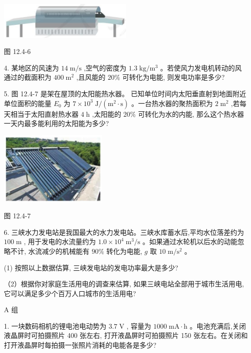 \documentclass[10pt]{article}
\begin{document}
\begin{center}
\includegraphics[max width=0.5\textwidth]{images/01911d5f-8e38-70c0-b5b8-2b399bd115b6_104_375437.jpg}
\end{center}

图 12.4-6

4. 某地区的风速为 \({14}\mathrm{\;m}/\mathrm{s}\) ,空气的密度为 \({1.3}\mathrm{\;{kg}}/{\mathrm{m}}^{3}\) 。若使风力发电机转动的风通过的截面积为 \({400}{\mathrm{\;m}}^{2}\) ,且风能的 \({20}\%\) 可转化为电能, 则发电功率是多少?

5. 图 12.4-7 是架在屋顶的太阳能热水器。 已知单位时间内太阳垂直射到地面附近单位面积的能量 \({E}_{0}\) 为 \(7 \times {10}^{3}\mathrm{\;J}/\left( {{\mathrm{m}}^{2} \cdot \mathrm{s}}\right)\) 。一台热水器的聚热面积为 \(2{\mathrm{\;m}}^{2}\) ,若每天相当于太阳直射热水器 \(4\mathrm{\;h}\) ,太阳能的 \({20}\%\) 可转化为水的内能, 那么这个热水器一天内最多能利用的太阳能为多少?

\begin{center}
\includegraphics[max width=0.4\textwidth]{images/01911d5f-8e38-70c0-b5b8-2b399bd115b6_104_257533.jpg}
\end{center}

图 12.4-7

6. 三峡水力发电站是我国最大的水力发电站。三峡水库蓄水后,平均水位落差约为 \({100}\mathrm{\;m}\) , 用于发电的水流量约为 \({1.0} \times {10}^{4}{\mathrm{\;m}}^{3}/\mathrm{s}\) 。如果通过水轮机以后水的动能忽略不计, 水流减少的机械能有 \({90}\%\) 转化为电能, \(g\) 取 \({10}\mathrm{\;m}/{\mathrm{s}}^{2}\) 。

(1) 按照以上数据估算, 三峡发电站的发电功率最大是多少?

（2）根据你对家庭生活用电的调查来估算, 如果三峡电站全部用于城市生活用电, 它可以满足多少个百万人口城市的生活用电?

A 组

1. 一块数码相机的锂电池电动势为 \({3.7}\mathrm{\;V}\) , 容量为 \({1000}\mathrm{\;{mA}} \cdot \mathrm{h}\) 。电池充满后,关闭液晶屏时可拍摄照片 400 张左右, 打开液晶屏时可拍摄照片 150 张左右。在关闭和打开液晶屏时每拍摄一张照片消耗的电能各是多少?
\end{document}
